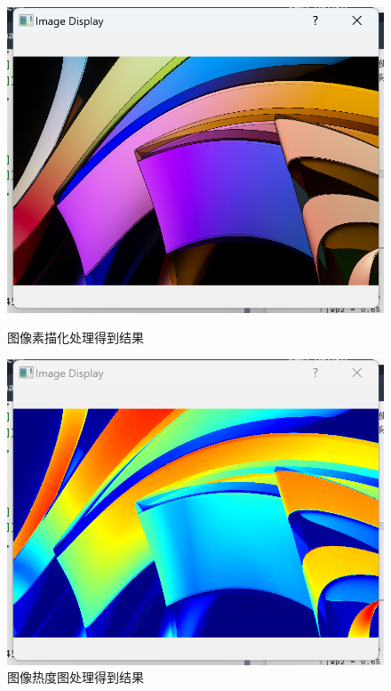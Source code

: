 \documentclass[a4paper,12pt]{article}
\begin{document}
\begin{figure}[h!]
    \vspace{0.2cm}
    
    \begin{minipage}[b]{0.48\textwidth}
        \centering
        \includegraphics[width=\linewidth]{images/Design/image_processing/3/sketch.png}
        \caption{图像素描化处理得到结果}
    \end{minipage}
    \hfill
    \begin{minipage}[b]{0.48\textwidth}
        \centering
        \includegraphics[width=\linewidth]{images/Design/image_processing/3/thermal.png}
        \caption{图像热度图处理得到结果}
    \end{minipage}
\end{figure}
\end{document}

